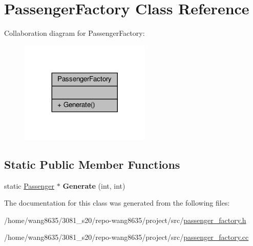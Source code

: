 \hypertarget{classPassengerFactory}{}\section{Passenger\+Factory Class Reference}
\label{classPassengerFactory}


Collaboration diagram for Passenger\+Factory\+:\nopagebreak
\begin{figure}[H]
\begin{center}
\leavevmode
\includegraphics[width=176pt]{classPassengerFactory__coll__graph}
\end{center}
\end{figure}
\subsection*{Static Public Member Functions}
\begin{DoxyCompactItemize}
\item 
\mbox{\label{classPassengerFactory_a2952ba78ceb285f445bc768d287230d2}} 
static \hyperlink{classPassenger}{Passenger} $\ast$ {\bfseries Generate} (int, int)
\end{DoxyCompactItemize}


The documentation for this class was generated from the following files\+:\begin{DoxyCompactItemize}
\item 
/home/wang8635/3081\+\_\+s20/repo-\/wang8635/project/src/\hyperlink{passenger__factory_8h}{passenger\+\_\+factory.\+h}\item 
/home/wang8635/3081\+\_\+s20/repo-\/wang8635/project/src/\hyperlink{passenger__factory_8cc}{passenger\+\_\+factory.\+cc}\end{DoxyCompactItemize}
